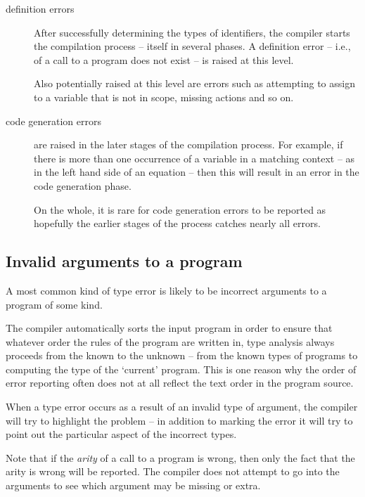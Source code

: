 \begin{description}
\item[definition errors]
After successfully determining the types of identifiers, the compiler starts the compilation process -- itself in several phases. A definition error -- i.e., of a call to a program does not exist -- is raised at this level.

Also potentially raised at this level are errors such as attempting to assign to a variable that is not in scope, missing  actions and so on.

\item[code generation errors]
are raised in the later stages of the compilation process. For example, if there is more than one occurrence of a variable in a matching context -- as in the left hand side of an equation -- then this will result in an error in the code generation phase.

On the whole, it is rare for code generation errors to be reported as hopefully the earlier stages of the process catches nearly all errors.
\end{description}

\subsection{Invalid arguments to a program}
A most common kind of type error is likely to be incorrect arguments to a program of some kind.

The compiler automatically sorts the input program in order to ensure that whatever order the rules of the program are written in, type analysis always proceeds from the known to the unknown -- from the known types of programs to computing the type of the `current' program. This is one reason why the order of error reporting often does not at all reflect the text order in the program source.

When a type error occurs as a result of an invalid type of argument, the compiler will try to highlight the problem -- in addition to marking the error it will try to point out the particular aspect of the incorrect types.

Note that if the \emph{arity} of a call to a program is wrong, then only the fact that the arity is wrong will be reported. The compiler does not attempt to go into the arguments to see which argument may be missing or extra.




